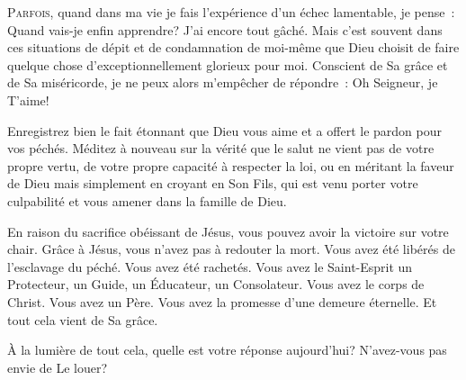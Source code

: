 \dvrule






\lettrine{P}{arfois}, quand dans ma vie je fais l'expérience
 d'un échec lamentable, je pense~: 
 \Og Quand vais-je enfin apprendre? J'ai encore tout gâché. \Fg{}
 Mais c'est souvent dans ces situations de dépit et de condamnation
 de moi-même que Dieu choisit de faire quelque chose d'exceptionnellement
 glorieux pour moi. Conscient de Sa grâce et de Sa miséricorde,
 je ne peux alors m'empêcher de répondre~: 
 \Og Oh Seigneur, je T'aime! \Fg{}


Enregistrez bien le fait étonnant que Dieu vous aime et a offert
 le pardon pour vos péchés. Méditez à nouveau sur la vérité
 que le salut ne vient pas de votre propre vertu,
 de votre propre capacité à respecter la loi,
 ou en méritant la faveur de Dieu mais simplement en croyant en Son Fils,
 qui est venu porter votre culpabilité et vous amener dans la famille de Dieu.

En raison du sacrifice obéissant de Jésus, vous pouvez avoir la victoire
 sur votre chair. Grâce à Jésus, vous n'avez pas à redouter la mort.
 Vous avez été libérés de l'esclavage du péché. Vous avez été rachetés.
 Vous avez le Saint-Esprit \ocadr un Protecteur, un Guide, un Éducateur,
 un Consolateur. Vous avez le corps de Christ. Vous avez un Père.
 Vous avez la promesse d'une demeure éternelle.
 Et tout cela vient de Sa grâce.

À la lumière de tout cela, quelle est votre réponse aujourd'hui?
 N'avez-vous pas envie de Le louer?

\dvrule



